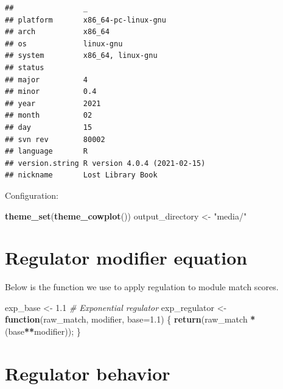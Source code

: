 \documentclass[]{book}
\newenvironment{Shaded}{\begin{snugshade}}{\end{snugshade}}
\newcommand{\CommentTok}[1]{\textcolor[rgb]{0.56,0.35,0.01}{\textit{#1}}}
\newcommand{\ControlFlowTok}[1]{\textcolor[rgb]{0.13,0.29,0.53}{\textbf{#1}}}
\newcommand{\DataTypeTok}[1]{\textcolor[rgb]{0.13,0.29,0.53}{#1}}
\newcommand{\FloatTok}[1]{\textcolor[rgb]{0.00,0.00,0.81}{#1}}
\newcommand{\KeywordTok}[1]{\textcolor[rgb]{0.13,0.29,0.53}{\textbf{#1}}}
\newcommand{\NormalTok}[1]{#1}
\newcommand{\OperatorTok}[1]{\textcolor[rgb]{0.81,0.36,0.00}{\textbf{#1}}}
\newcommand{\StringTok}[1]{\textcolor[rgb]{0.31,0.60,0.02}{#1}}
\begin{document}
\begin{verbatim}
##                _                           
## platform       x86_64-pc-linux-gnu         
## arch           x86_64                      
## os             linux-gnu                   
## system         x86_64, linux-gnu           
## status                                     
## major          4                           
## minor          0.4                         
## year           2021                        
## month          02                          
## day            15                          
## svn rev        80002                       
## language       R                           
## version.string R version 4.0.4 (2021-02-15)
## nickname       Lost Library Book
\end{verbatim}

Configuration:

\begin{Shaded}
\begin{Highlighting}[]
\KeywordTok{theme_set}\NormalTok{(}\KeywordTok{theme_cowplot}\NormalTok{())}
\NormalTok{output_directory <-}\StringTok{ "media/"}
\end{Highlighting}
\end{Shaded}

\hypertarget{regulator-modifier-equation}{%
\section{Regulator modifier equation}\label{regulator-modifier-equation}}

Below is the function we use to apply regulation to module match scores.

\begin{Shaded}
\begin{Highlighting}[]
\NormalTok{exp_base <-}\StringTok{ }\FloatTok{1.1}
\CommentTok{# Exponential regulator}
\NormalTok{exp_regulator <-}\StringTok{ }\ControlFlowTok{function}\NormalTok{(raw_match, modifier, }\DataTypeTok{base=}\FloatTok{1.1}\NormalTok{) \{}
  \KeywordTok{return}\NormalTok{(raw_match }\OperatorTok{*}\StringTok{ }\NormalTok{(base}\OperatorTok{**}\NormalTok{modifier));}
\NormalTok{\}}
\end{Highlighting}
\end{Shaded}

\hypertarget{regulator-behavior}{%
\section{Regulator behavior}\label{regulator-behavior}}
\end{document}

